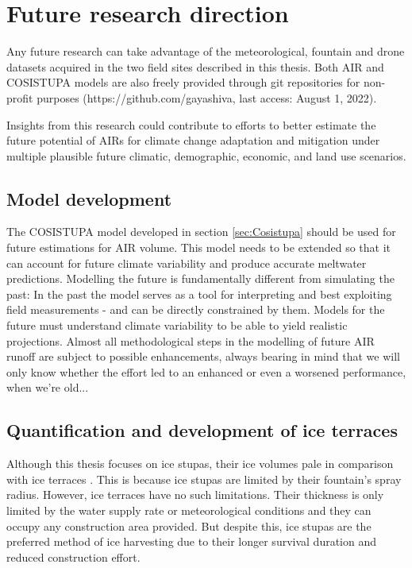 \section{Future research direction}

Any future research can take advantage of the meteorological, fountain and drone datasets acquired in the two field
sites described in this thesis. Both AIR and COSISTUPA models are also freely provided through git repositories
for non-profit purposes (https://github.com/gayashiva, last access: August 1, 2022).

Insights from this research could contribute to efforts to better estimate the future potential of AIRs for
climate change adaptation and mitigation under multiple plausible future climatic, demographic, economic, and
land use scenarios.

\subsection{Model development}

The COSISTUPA model developed in section \ref{sec:Cosistupa} should be used for future estimations for AIR volume. This model
needs to be extended so that it can account for future climate variability and produce accurate meltwater
predictions. Modelling the future is fundamentally different from simulating the past: In the past the model
serves as a tool for interpreting and best exploiting field measurements - and can be directly constrained by
them. Models for the future must understand climate variability to be able to yield realistic projections.
Almost all methodological steps in the modelling of future AIR runoff are subject to possible enhancements,
always bearing in mind that we will only know whether the effort led to an enhanced or even a worsened
performance, when we're old...

\subsection{Quantification and development of ice terraces}

Although this thesis focuses on ice stupas, their ice volumes pale in comparison with ice terraces
\citep{nusserSociohydrologyArtificialGlaciers2019}. This is because ice stupas are limited by their fountain's
spray radius. However, ice terraces have no such limitations. Their thickness is only limited by the water
supply rate or meteorological conditions and they can occupy any construction area provided. But despite this, ice
stupas are the preferred method of ice harvesting due to their longer survival duration and reduced construction
effort.

